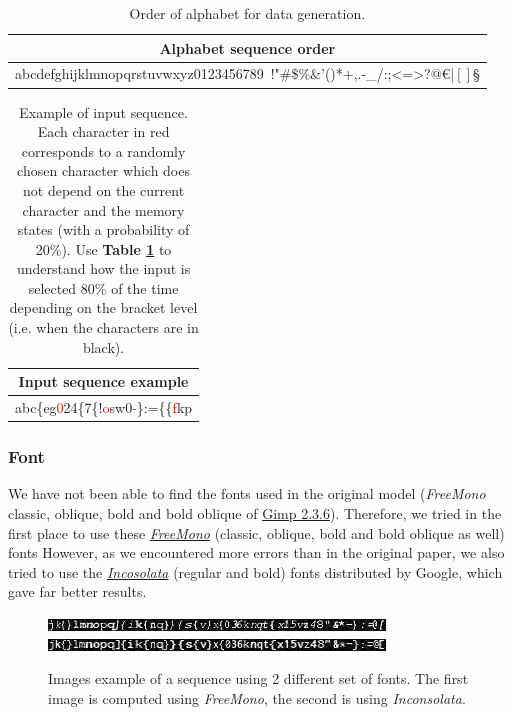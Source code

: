 \begin{table}[!ht]
    \centering
    \begin{tabular}{|c|}
        \hline
        \textbf{Alphabet sequence order} \\ \hline \hline
        abcdefghijklmnopqrstuvwxyz0123456789\ !"\#\$\%\&'()*+,.-\_/:;<=>?@€|$[]$§\\ \hline %
    \end{tabular}
    \caption{Order of alphabet for data generation.}
    \label{tab:alphabet}
\end{table}

\begin{table}[!ht]
    \centering
    \begin{tabular}{|c|}
        \hline
        \textbf{Input sequence example} \\ \hline \hline
        abc\{eg\textcolor{red}{0}24\{7\{!\textcolor{red}{o}sw0\textcolor{red}{-}\}:=\{\{\textcolor{red}{f}kp\\ \hline
    \end{tabular}
    \caption{Example of input sequence. Each character in red corresponds to a randomly chosen character which does not depend on the current character and the memory states (with a probability of 20\%). Use \textbf{Table \ref{tab:alphabet}} to understand how the input is selected 80\% of the time depending on the bracket level (i.e. when the characters are in black).}
    \label{tab:sequence_example}
\end{table}

\subsubsection{Font}

We have not been able to find the fonts used in the original model (\textit{FreeMono} classic, oblique, bold and bold oblique of \href{https://gimp.software/2018/11/13/download-gimp-2-3-6/}{Gimp 2.3.6}).
Therefore, we tried in the first place to use these \href{https://www.fontspace.com/gnu-freefont/freemono}{\textit{FreeMono}} (classic, oblique, bold and bold oblique as well) fonts
However, as we encountered more errors than in the original paper, we also tried to use the \href{https://fonts.google.com/specimen/Inconsolata}{\textit{Incosolata}} (regular and bold) fonts distributed by Google, which gave far better results.

\begin{figure}[h]
    \centering
    \includegraphics[width = \linewidth]{data/input_freemono.png}
    \includegraphics[width = \linewidth]{data/input_inconsolata.png}
    \caption{Images example of a sequence using 2 different set of fonts. The first image is computed using \textit{FreeMono}, the second is using \textit{Inconsolata}.}
    \label{fig:input_imgs}
\end{figure}

